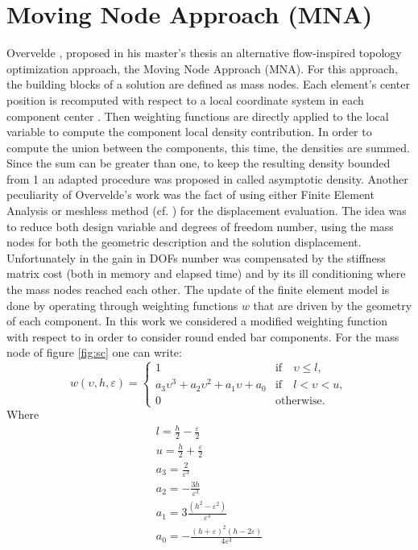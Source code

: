 \section{Moving Node Approach (MNA)}
\label{MNA}
Overvelde \cite{overvelde2012moving}, proposed in his master's thesis an alternative flow-inspired topology optimization approach, the Moving Node Approach (MNA). For this approach, the building blocks of a solution are defined as mass nodes. Each element's center position is recomputed with respect to a local coordinate system in each component center . Then weighting functions are directly applied to the local variable to compute the component local density contribution. In order to compute the union between the components, this time, the densities are summed. Since the sum can be greater than one, to keep the resulting density bounded from 1 an adapted procedure was proposed in \cite{overvelde2012moving} called asymptotic density. Another peculiarity of Overvelde's work was the fact of using either Finite Element Analysis or meshless method (cf. \cite{nguyen2008meshless}) for the displacement evaluation. The idea was to reduce both design variable and degrees of freedom number, using the mass nodes for both the geometric description and the solution displacement. Unfortunately in \cite{overvelde2012moving} the gain in DOFs number was compensated  by the stiffness matrix cost (both in memory and elapsed time) and by its ill conditioning where the mass nodes reached each other. The update of the finite element model is done by operating through weighting functions $w$ that are driven by the geometry of each component. In this work we considered a modified weighting function with respect to \cite{overvelde2012moving} in order to consider round ended bar components. For the mass node of figure \ref{fig:sc} one can write:
\begin{equation}
\label{eq.MNA.W}
    w(\upsilon,h,\varepsilon)=\begin{cases}
    1 & \text{if} \quad \upsilon\leq l,\\
    a_3\upsilon^3+a_2\upsilon^2+a_1\upsilon+a_0 & \text{if} \quad l<\upsilon<u,\\
    0 & \text{otherwise}.
    \end{cases}
\end{equation}
Where
\begin{eqnarray}
    l=\frac{h}{2}-\frac{\varepsilon}{2} \\  u=\frac{h}{2}+\frac{\varepsilon}{2} \\
    a_3=\frac{2}{\varepsilon^3}\\
    a_2=-\frac{3h}{\varepsilon^3}\\
     a_1=3\frac{\left(h^2-\varepsilon^2\right)}{\varepsilon^3}\\
      a_0=-\frac{(h+\varepsilon)^2(h-2\varepsilon)}{4\varepsilon^3}
\end{eqnarray}

